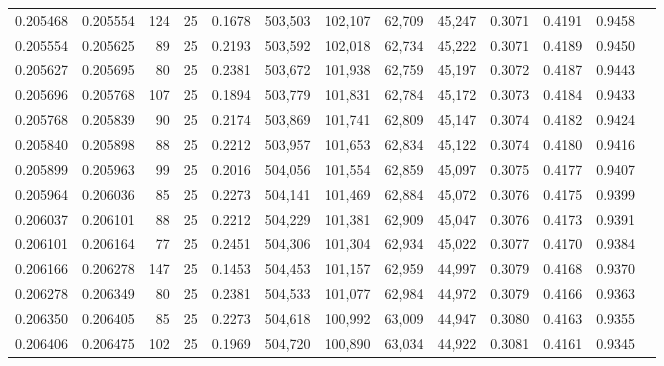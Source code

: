 \begin{tabular}{rrrrrrrrrrrrr}
0.205468 & 0.205554 &   124 &  25 &                                     0.1678 & 503,503 & 102,107 &  62,709 &  45,247 & 0.3071 & 0.4191 & 0.9458 \\
0.205554 & 0.205625 &    89 &  25 &                                     0.2193 & 503,592 & 102,018 &  62,734 &  45,222 & 0.3071 & 0.4189 & 0.9450 \\
0.205627 & 0.205695 &    80 &  25 &                                     0.2381 & 503,672 & 101,938 &  62,759 &  45,197 & 0.3072 & 0.4187 & 0.9443 \\
0.205696 & 0.205768 &   107 &  25 &                                     0.1894 & 503,779 & 101,831 &  62,784 &  45,172 & 0.3073 & 0.4184 & 0.9433 \\
0.205768 & 0.205839 &    90 &  25 &                                     0.2174 & 503,869 & 101,741 &  62,809 &  45,147 & 0.3074 & 0.4182 & 0.9424 \\
0.205840 & 0.205898 &    88 &  25 &                                     0.2212 & 503,957 & 101,653 &  62,834 &  45,122 & 0.3074 & 0.4180 & 0.9416 \\
0.205899 & 0.205963 &    99 &  25 &                                     0.2016 & 504,056 & 101,554 &  62,859 &  45,097 & 0.3075 & 0.4177 & 0.9407 \\
0.205964 & 0.206036 &    85 &  25 &                                     0.2273 & 504,141 & 101,469 &  62,884 &  45,072 & 0.3076 & 0.4175 & 0.9399 \\
0.206037 & 0.206101 &    88 &  25 &                                     0.2212 & 504,229 & 101,381 &  62,909 &  45,047 & 0.3076 & 0.4173 & 0.9391 \\
0.206101 & 0.206164 &    77 &  25 &                                     0.2451 & 504,306 & 101,304 &  62,934 &  45,022 & 0.3077 & 0.4170 & 0.9384 \\
0.206166 & 0.206278 &   147 &  25 &                                     0.1453 & 504,453 & 101,157 &  62,959 &  44,997 & 0.3079 & 0.4168 & 0.9370 \\
0.206278 & 0.206349 &    80 &  25 &                                     0.2381 & 504,533 & 101,077 &  62,984 &  44,972 & 0.3079 & 0.4166 & 0.9363 \\
0.206350 & 0.206405 &    85 &  25 &                                     0.2273 & 504,618 & 100,992 &  63,009 &  44,947 & 0.3080 & 0.4163 & 0.9355 \\
0.206406 & 0.206475 &   102 &  25 &                                     0.1969 & 504,720 & 100,890 &  63,034 &  44,922 & 0.3081 & 0.4161 & 0.9345 \\

\end{tabular}
